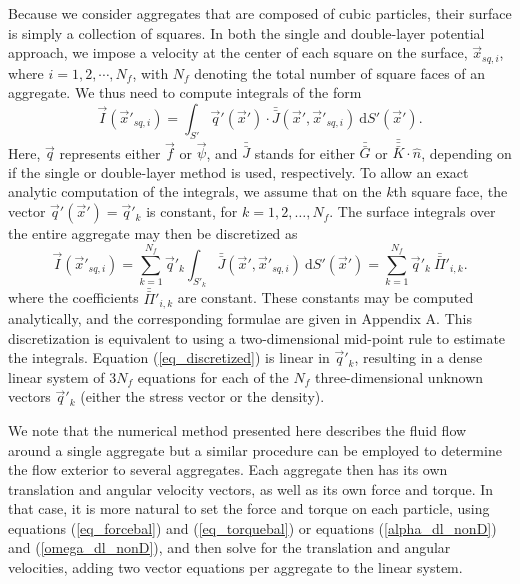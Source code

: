  \par
 Because we consider aggregates that are composed of cubic particles, their surface is simply a collection of squares.
 In both the single and double-layer potential approach, we impose a velocity at the center of each square on the surface, $\vec{x}_{sq,i}$, where $i = 1,2, \cdots, N_f$, with $N_f$ denoting the total number of square faces of an aggregate. We thus need to compute integrals of the form
 \begin{equation}
 \vec{I}(\vec{x}'_{sq,i}) = \int_{S'} \vec{q}'(\vec{x}') \cdot {\bar{\bar{J}}} (\vec{x}', \vec{x}'_{sq,i}) \ \text{d} S'(\vec{x}').
 \label{eq_pre_discretize}
 \end{equation}
 Here, $\vec{q}$ represents either $\vec{f}$ or $\vec{\psi}$, and $\bar{\bar{J}}$ stands for either $\bar{\bar{G}}$ or $\bar{\bar{\bar{K}}}\cdot\hat{n}$, depending on if the single or double-layer method is used, respectively.  To allow an exact analytic computation of the integrals, we assume that on the $k$th square face, the vector $\vec{q}'(\vec{x}') = \vec{q}'_k$ is constant, for $k = 1, 2, \dots, N_f$.
 The surface integrals over the entire aggregate may then be discretized as
 \begin{equation}
 \vec{I}(\vec{x}'_{sq,i})  =   \sum_{k=1}^{N_f}  \vec{q}'_k   \int_{S'_{k}} \bar{\bar{J}}(\vec{x}',\vec{x}'_{sq,i}) \ \text{d}S'(\vec{x}') = \sum_{k=1}^{N_f} \vec{q}'_k   \ \bar{\bar{\Pi}}'_{i,k}.
 \label{eq_discretized}
 \end{equation}
 where the coefficients $\bar{\bar{\Pi}}'_{i,k}$ are constant. These constants may be computed analytically, and the corresponding formulae are given in Appendix A.
  This discretization is equivalent to using a two-dimensional mid-point rule to estimate the integrals.  Equation (\ref{eq_discretized}) is linear in $\vec{q}'_k$, resulting in a dense linear system of 3$N_f$ equations for each of the $N_f$ three-dimensional unknown vectors $\vec{q}'_k$ (either the stress vector or the density). 
 \par
 We note that the numerical method presented here describes the fluid flow around a single aggregate but a similar procedure can be employed to determine the flow exterior to several aggregates. Each aggregate then has its own translation and angular velocity vectors, as well as its own force and torque. In that case, it is more natural to set the force and torque on each particle, using equations (\ref{eq_forcebal}) and (\ref{eq_torquebal}) or equations  (\ref{alpha_dl_nonD}) and (\ref{omega_dl_nonD}), and then solve for the translation and angular velocities, adding two vector equations per aggregate to the linear system.
